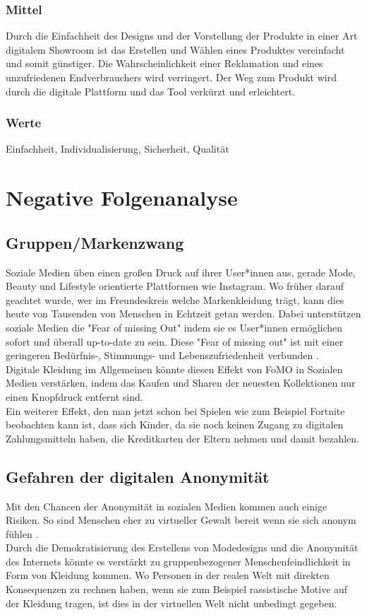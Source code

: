 \documentclass{article}
\begin{document}
\subsubsection{Mittel}
Durch die Einfachheit des Designs und der Vorstellung der Produkte in einer Art digitalem Showroom ist das Erstellen und Wählen eines Produktes vereinfacht und somit günstiger. Die Wahrscheinlichkeit einer Reklamation und eines unzufriedenen Endverbrauchers wird verringert. Der Weg zum Produkt wird durch die digitale Plattform und das Tool verkürzt und erleichtert.
\subsubsection{Werte}
Einfachheit, Individualisierung, Sicherheit, Qualität

\newpage

\section{Negative Folgenanalyse}

\subsection{Gruppen/Markenzwang}
Soziale Medien üben einen großen Druck auf ihrer User*innen aus, gerade Mode, Beauty und Lifestyle orientierte Plattformen wie Instagram. Wo früher darauf geachtet wurde, wer im Freundeskreis welche Markenkleidung trägt, kann dies heute von Tausenden von Menschen in Echtzeit getan werden. Dabei unterstützen soziale Medien die "Fear of missing Out" indem sie es User*innen ermöglichen sofort und überall up-to-date zu sein. Diese "Fear of missing out" ist mit einer geringeren Bedürfnis-, Stimmungs- und Lebenszufriedenheit verbunden \cite{Przybylski2013}. 
\\[2ex]
Digitale Kleidung im Allgemeinen könnte diesen Effekt von FoMO in Sozialen Medien verstärken, indem das Kaufen und Sharen der neuesten Kollektionen nur einen Knopfdruck entfernt sind.
\\[2ex]
Ein weiterer Effekt, den man jetzt schon bei Spielen wie zum Beispiel Fortnite beobachten kann ist, dass sich Kinder, da sie noch keinen Zugang zu digitalen Zahlungsmitteln haben, die Kreditkarten der Eltern nehmen und damit bezahlen.

\subsection{Gefahren der digitalen Anonymität}
Mit den Chancen der Anonymität in sozialen Medien kommen auch einige Risiken. So sind Menschen eher zu virtueller Gewalt bereit wenn sie sich anonym fühlen \cite{1971-08069-001}.
\\[2ex]
Durch die Demokratisierung des Erstellens von Modedesigns und die Anonymität des Internets könnte es verstärkt zu gruppenbezogener Menschenfeindlichkeit in Form von Kleidung kommen. Wo Personen in der realen Welt mit direkten Konsequenzen zu rechnen haben, wenn sie zum Beispiel rassistische Motive auf der Kleidung tragen, ist dies in der virtuellen Welt nicht unbedingt gegeben.
\end{document}
